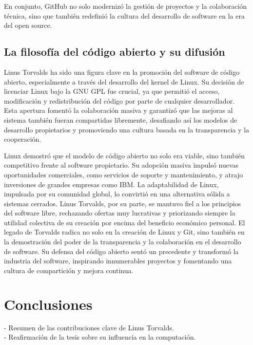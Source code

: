\documentclass[a4paper,12pt]{article}
\begin{document}
En conjunto, GitHub no solo modernizó la gestión de proyectos y la colaboración
técnica, sino que también redefinió la cultura del desarrollo de software en la
era del open source.

\subsection{La filosofía del código abierto y su difusión} 

Linus Torvalds ha sido una figura clave en la promoción del software de código
abierto, especialmente a través del desarrollo del kernel de Linux. Su decisión
de licenciar Linux bajo la GNU GPL fue crucial, ya que permitió el acceso,
modificación y redistribución del código por parte de cualquier desarrollador.
Esta apertura fomentó la colaboración masiva y garantizó que las mejoras al
sistema también fueran compartidas libremente, desafiando así los modelos de
desarrollo propietarios y promoviendo una cultura basada en la transparencia y
la cooperación.

Linux demostró que el modelo de código abierto no solo era viable, sino también
competitivo frente al software propietario. Su adopción masiva impulsó nuevas
oportunidades comerciales, como servicios de soporte y mantenimiento, y atrajo
inversiones de grandes empresas como IBM. La adaptabilidad de Linux, impulsada
por su comunidad global, lo convirtió en una alternativa sólida a sistemas
cerrados. Linus Torvalds, por su parte, se mantuvo fiel a los principios del
software libre, rechazando ofertas muy lucrativas y priorizando siempre la utilidad
colectiva de su creación por encima del beneficio económico personal. 
El legado de Torvalds radica no solo en la creación de Linux y Git, sino también en la
demostración del poder de la transparencia y la colaboración en el desarrollo de
software. Su defensa del código abierto sentó un precedente y transformó la
industria del software, inspirando innumerables proyectos y fomentando una
cultura de compartición y mejora continua. 

\section{Conclusiones}

- Resumen de las contribuciones clave de Linus Torvalds.\\ 

- Reafirmación de la tesis sobre su influencia en la computación.\\
\end{document}
